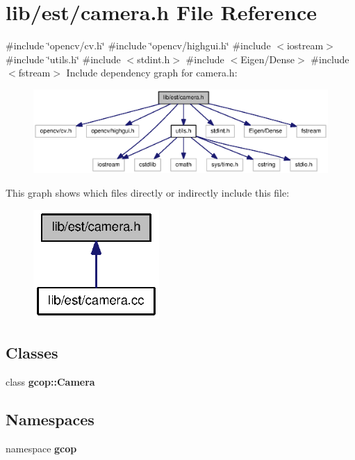 \section{lib/est/camera.h \-File \-Reference}
\label{camera_8h}
{\ttfamily \#include \char`\"{}opencv/cv.\-h\char`\"{}}\*
{\ttfamily \#include \char`\"{}opencv/highgui.\-h\char`\"{}}\*
{\ttfamily \#include $<$iostream$>$}\*
{\ttfamily \#include \char`\"{}utils.\-h\char`\"{}}\*
{\ttfamily \#include $<$stdint.\-h$>$}\*
{\ttfamily \#include $<$\-Eigen/\-Dense$>$}\*
{\ttfamily \#include $<$fstream$>$}\*
\-Include dependency graph for camera.\-h\-:
\nopagebreak
\begin{figure}[H]
\begin{center}
\leavevmode
\includegraphics[width=350pt]{camera_8h__incl}
\end{center}
\end{figure}
\-This graph shows which files directly or indirectly include this file\-:
\nopagebreak
\begin{figure}[H]
\begin{center}
\leavevmode
\includegraphics[width=136pt]{camera_8h__dep__incl}
\end{center}
\end{figure}
\subsection*{\-Classes}
\begin{DoxyCompactItemize}
\item 
class {\bf gcop\-::\-Camera}
\end{DoxyCompactItemize}
\subsection*{\-Namespaces}
\begin{DoxyCompactItemize}
\item 
namespace {\bf gcop}
\end{DoxyCompactItemize}
